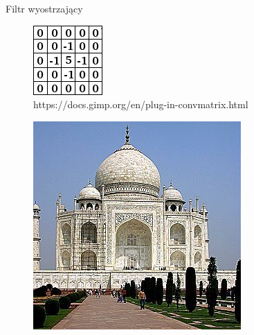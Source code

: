 \documentclass[xcolor=dvipsnames]{beamer}
\begin{document}
\begin{frame}{Filtr wyostrzający}
	\begin{minipage}[t]{0.3\linewidth}
		\vfill
		\begin{figure}
			\includegraphics[width=\linewidth]{img/convolution-sharpen.png}
			\caption{https://docs.gimp.org/en/plug-in-convmatrix.html}
		\end{figure}	
	\end{minipage}%
	\hfill
	\begin{minipage}[t]{0.6\linewidth}
		\vfill
		\begin{figure}
			\includegraphics[width=\linewidth, height=0.7\textheight, keepaspectratio]{img/taj-sharpen.jpg}

\end{figure}
\end{minipage}
\end{frame}
\end{document}
